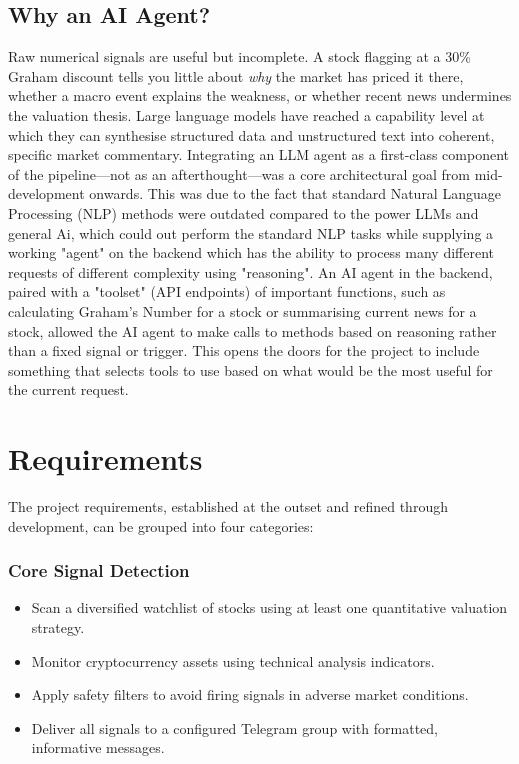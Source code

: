 \documentclass[12pt,a4paper]{article}
\begin{document}
\subsection{Why an AI Agent?}

Raw numerical signals are useful but incomplete. A stock flagging at a 30\% Graham discount tells you little about \textit{why} the market has priced it there, whether a macro event explains the weakness, or whether recent news undermines the valuation thesis. Large language models have reached a capability level at which they can synthesise structured data and unstructured text into coherent, specific market commentary. Integrating an LLM agent as a first-class component of the pipeline---not as an afterthought---was a core architectural goal from mid-development onwards. This was due to the fact that standard Natural Language Processing (NLP) methods were outdated compared to the power LLMs and general Ai, which could out perform the standard NLP tasks while supplying a working "agent" on the backend which has the ability to process many different requests of different complexity using "reasoning". An AI agent in the backend, paired with a "toolset" (API endpoints) of important functions, such as calculating Graham's Number for a stock or summarising current news for a stock, allowed the AI agent to make calls to methods based on reasoning rather than a fixed signal or trigger. This opens the doors for the project to include something that selects tools to use based on what would be the most useful for the current request.

\section{Requirements}

The project requirements, established at the outset and refined through development, can be grouped into four categories:

\subsubsection*{Core Signal Detection}
\begin{itemize}[leftmargin=1.5em]
    \item Scan a diversified watchlist of stocks using at least one quantitative valuation strategy.
    \item Monitor cryptocurrency assets using technical analysis indicators.
    \item Apply safety filters to avoid firing signals in adverse market conditions.
    \item Deliver all signals to a configured Telegram group with formatted, informative messages.
\end{itemize}
\end{document}
